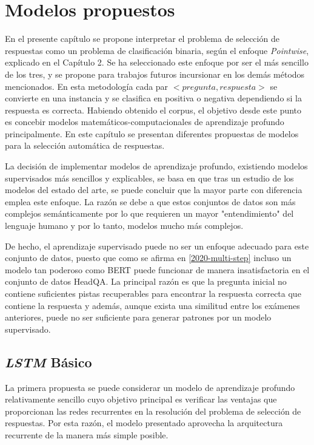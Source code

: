 \chapter{Modelos propuestos}\label{chapter:models}

En el presente capítulo se propone interpretar el problema de selección de respuestas como un problema de clasificación binaria, según el enfoque \textit{Pointwise}, explicado en el Capítulo 2. Se ha seleccionado este enfoque por ser el más sencillo de los tres, y se propone para trabajos futuros incursionar en los demás métodos mencionados. En esta metodología cada par $<pregunta, respuesta>$ se convierte en una instancia y se clasifica en positiva o negativa dependiendo si la respuesta es correcta. Habiendo obtenido el corpus, el objetivo desde este punto es concebir modelos matemáticos-computacionales de aprendizaje profundo principalmente. En este capítulo se presentan diferentes propuestas de modelos para la selección automática de respuestas. 

La decisión de implementar modelos de aprendizaje profundo, existiendo modelos supervisados más sencillos y explicables, se basa en que tras un estudio de los modelos del estado del arte, se puede concluir que la mayor parte con diferencia emplea este enfoque. La razón se debe a que estos conjuntos de datos son más complejos semánticamente por lo que requieren un mayor "entendimiento" del lenguaje humano y por lo tanto, modelos mucho más complejos. 

De hecho, el aprendizaje supervisado puede no ser un enfoque adecuado para este conjunto de datos, puesto que como se afirma en \ref{2020-multi-step} incluso un modelo tan poderoso como BERT puede funcionar de manera insatisfactoria en el conjunto de datos HeadQA. La principal razón es que la pregunta inicial no contiene suficientes pistas recuperables para encontrar la respuesta correcta que contiene la respuesta y además, aunque exista una similitud entre los exámenes anteriores, puede no ser suficiente para generar patrones por un modelo supervisado.


\section{\textit{LSTM} Básico}\label{lstm_t}

La primera propuesta se puede considerar un modelo de aprendizaje profundo relativamente sencillo cuyo objetivo principal es verificar las ventajas que proporcionan las redes recurrentes en la resolución del problema de selección de respuestas. Por esta razón, el modelo presentado aprovecha la arquitectura recurrente de la manera más simple posible.

